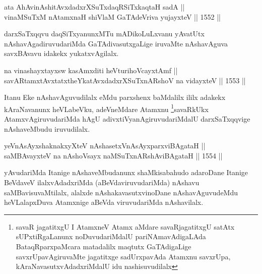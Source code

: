 
\begin{shl}
ata AhAvinAshitAvxdadxrXSuTxdaqRSiTxkaqtaH sadA ||  \\
\footnotemark[5]vinaMSuTxM nA\s \s tamxnaH shiVlaM GaTAdeVriva yujayxteV \hfill || 1552 ||  
\end{shl}
\begin{artha}
darxSaTxqqvu daqSiTxyanunxMTu mADikoLuLxvanu yAvatUtx nAshavAgadiruvudariMda GaTAdivasutxgaLige iruvaMte nAshavAguva savxBAvavu idakekx yukatxvAgilalx.
\end{artha}

\begin{shl}
na vinashayxtayxsw kasAmxditi heVturihoVcayxtAmf || \\
\footnotemark[6]savARtamxtAvxtatxtheYkatAvxdadxrXSuTxnARshoV na vidayxteV \hfill || 1553 ||  
\end{shl}

\begin{artha}
Itanu Eke nAshavAguvudilalx eMdu parxshenx baMdalilx ililx adakekx kAraNavanunx heVLabeVku, adeVneMdare Atamxnu \footnote{savaR jagatitxgU I AtamxneV Atamx aMdare savaRjagatitxgU satAtx sUPxtiRgaLanunx noDuvudariMdalU pariNAmavAdigaLAda BataqRparxpaMcara matadalilx maqtutx GaTAdigaLige savxrUpavAgiruvaMte jagatitxge sadUrxpavAda Atamxnu savxrUpa, kAraNavasutxvAdadxriMdalU idu nashisuvudilalx}savaRkUkx AtamxvAgiruvudariMda hAgU adivxtiVyanAgiruvudariMdalU darxSaTxqqvige nAshaveMbudu iruvudilalx.
\end{artha}


\begin{shl}
yeVnAsAyx\s \s shaknakxyXteV nAshasetxVnAsAyxparxviBAgataH || \\
\footnotemark[1]saMBAvayxteV na nAshoV\s sayx naMSuTxnARshAviBAgataH \hfill || 1554 ||  
\end{shl}

\begin{artha}
yAvudariMda Itanige nAshaveMbudanunx shaMkisabahudo adaroDane Itanige BeVdaveV ilalxvAdadxriMda (aBeVdaviruvudariMda) nAshavu saMBavisuvaMtilalx, alalxde nAshakavasutxvinoDane nAshavAguvudeMdu heVLalapxDuva Atamxnige aBeVda viruvudariMda nAshavilalx.
\end{artha}

